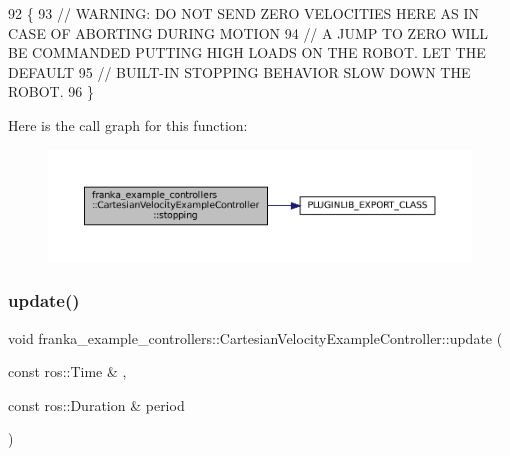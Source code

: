 \begin{DoxyCode}
92                                                                   \{
93   \textcolor{comment}{// WARNING: DO NOT SEND ZERO VELOCITIES HERE AS IN CASE OF ABORTING DURING MOTION}
94   \textcolor{comment}{// A JUMP TO ZERO WILL BE COMMANDED PUTTING HIGH LOADS ON THE ROBOT. LET THE DEFAULT}
95   \textcolor{comment}{// BUILT-IN STOPPING BEHAVIOR SLOW DOWN THE ROBOT.}
96 \}
\end{DoxyCode}
Here is the call graph for this function\+:
\nopagebreak
\begin{figure}[H]
\begin{center}
\leavevmode
\includegraphics[width=350pt]{classfranka__example__controllers_1_1CartesianVelocityExampleController_a03ffcb4dd32fa51329f7600384ff22d6_cgraph}
\end{center}
\end{figure}
\mbox{\label{classfranka__example__controllers_1_1CartesianVelocityExampleController_ab39ae92f4a9059066d6f18a6dddeb2b3}} 
\subsubsection{\texorpdfstring{update()}{update()}}
{\footnotesize\ttfamily void franka\+\_\+example\+\_\+controllers\+::\+Cartesian\+Velocity\+Example\+Controller\+::update (\begin{DoxyParamCaption}\item[{const ros\+::\+Time \&}]{,  }\item[{const ros\+::\+Duration \&}]{period }\end{DoxyParamCaption})\hspace{0.3cm}{\ttfamily [override]}}



